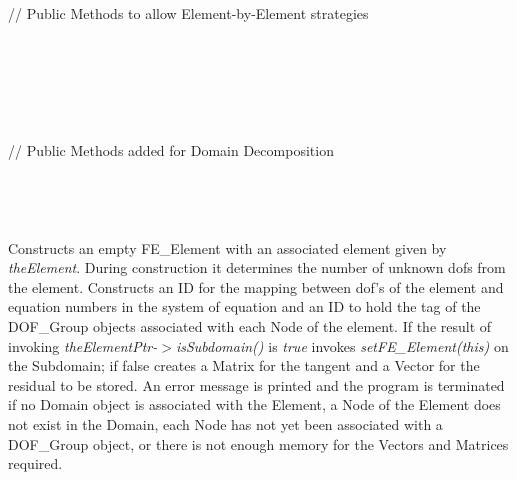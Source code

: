 \indent{}\\ 
\indent{}\\ 
\indent{}\\ 
\indent{}\\ 
\indent{}\\  \\
\indent\indent // Public Methods to allow Element-by-Element strategies \\
\indent{}\\
\indent{}\\ 
\indent{}\\ 
\indent{}\\
\indent{}\\ \\
\indent\indent // Public Methods added for Domain Decomposition \\
\indent{} \\
\indent{} \\

  \\
  \\
Constructs an empty FE\_Element with an associated element given by {\em
theElement}.  During construction it determines the number of unknown
dofs from the element. Constructs an ID for the mapping between dof's of
the element and equation numbers in the system of equation and an ID
to hold the tag of the DOF\_Group objects associated with each Node of
the element. If the result of invoking {\em
theElementPtr-$>$isSubdomain()} is {\em true} invokes {\em
setFE\_Element(this)} on the Subdomain; if false creates a Matrix 
for the tangent and a Vector for the residual to be stored. An error
message is printed and the program is terminated if no Domain object
is associated with the Element, a Node of the Element does not exist
in the Domain, each Node has not yet been associated with a DOF\_Group
object, or there is not enough memory for the Vectors and Matrices
required. \\  

